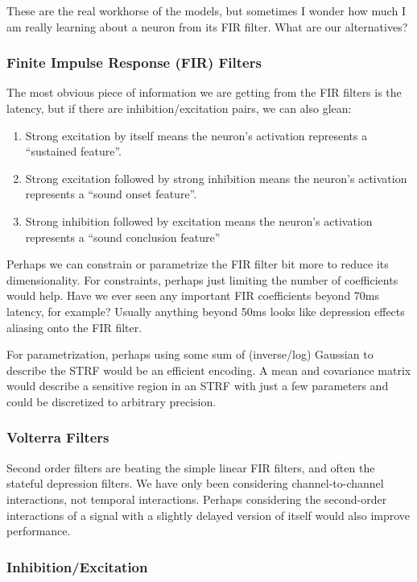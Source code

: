 \documentclass[11pt]{article}
\begin{document}
   These are the real workhorse of the models, but sometimes I wonder how much I am really learning about a neuron from its FIR filter. What are our alternatives?

\subsubsection{Finite Impulse Response (FIR) Filters}
\label{sec-2.5.1}


     The most obvious piece of information we are getting from the FIR filters is the latency, but if there are inhibition/excitation pairs, we can also glean:

\begin{enumerate}
\item Strong excitation by itself means the neuron's activation represents a ``sustained feature''.
\item Strong excitation followed by strong inhibition means the neuron's activation represents a ``sound onset feature''.
\item Strong inhibition followed by excitation means the neuron's activation represents a ``sound conclusion feature''
\end{enumerate}
    Perhaps we can constrain or parametrize the FIR filter bit more to reduce its dimensionality. For constraints, perhaps just limiting the number of coefficients would help. Have we ever seen any important FIR coefficients beyond 70ms latency, for example? Usually anything beyond 50ms looks like depression effects aliasing onto the FIR filter. 

    For parametrization, perhaps using some sum of (inverse/log) Gaussian to describe the STRF would be an efficient encoding. A mean and covariance matrix would describe a sensitive region in an STRF with just a few parameters and could be discretized to arbitrary precision.

\subsubsection{Volterra Filters}
\label{sec-2.5.2}


    Second order filters are beating the simple linear FIR filters, and often the stateful depression filters. We have only been considering channel-to-channel interactions, not temporal interactions. Perhaps considering the second-order interactions of a signal with a slightly delayed version of itself would also improve performance.

\subsubsection{Inhibition/Excitation}
\label{sec-2.5.3}
\end{document}
